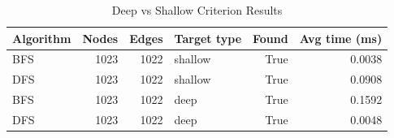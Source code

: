 \begin{table}[H]
\centering
\caption{Deep vs Shallow Criterion Results}
\begin{tabular}{lrrlrr}
\toprule
Algorithm & Nodes & Edges & Target type & Found & Avg time (ms)\\
\midrule
BFS & 1023 & 1022 & shallow & True & 0.0038\\
DFS & 1023 & 1022 & shallow & True & 0.0908\\
BFS & 1023 & 1022 & deep & True & 0.1592\\
DFS & 1023 & 1022 & deep & True & 0.0048\\
\bottomrule
\end{tabular}
\end{table}

